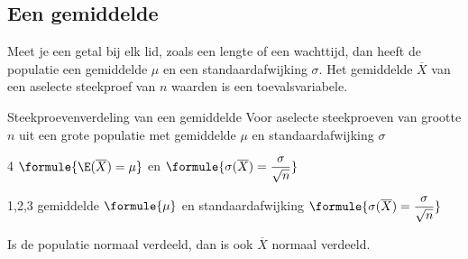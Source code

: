 \begin{oefeningen}
\end{oefeningen}

\subsection{Een gemiddelde}

Meet je een getal bij elk lid, zoals een lengte of een wachttijd, dan heeft de populatie een gemiddelde $\mu$ en een standaardafwijking $\sigma$. Het gemiddelde $\overline{X}$ van een aselecte steekproef van $n$ waarden is een toevalsvariabele.

\begin{theorie}
\begin{stelling}{Steekproevenverdeling van een gemiddelde}
Voor aselecte steekproeven van grootte $n$ uit een grote populatie met gemiddelde $\mu$ en standaardafwijking $\sigma$ 

\vspace{1mm}
\begin{alleenvoor}{4}
\qquad $\formule{\E(\overline{X}) = \mu}$ \qquad en \qquad $\formule{\sigma(\overline{X}) = \dfrac{\sigma}{\sqrt{n}}}$
\end{alleenvoor}
\begin{alleenvoor}{1,2,3}
\qquad gemiddelde $\formule{\mu}$ \qquad en standaardafwijking \qquad $\formule{\sigma(\overline{X}) = \dfrac{\sigma}{\sqrt{n}}}$
\end{alleenvoor}

\vspace{1mm}
Is de populatie normaal verdeeld, dan is ook $\overline{X}$ normaal verdeeld.
\end{stelling}
\end{theorie}


